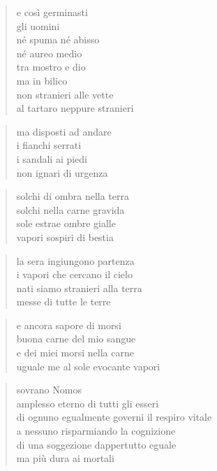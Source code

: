 	\begin{verse}
		e così germinasti\\
		gli uomini\\
		né spuma né abisso\\
		né aureo medio\\
		tra mostro e dio\\
		ma in bilico\\
		non stranieri alle vette\\
		al tartaro neppure stranieri
	\end{verse}

	\begin{verse}
		ma disposti ad andare\\
		i fianchi serrati\\
		i sandali ai piedi\\
		non ignari di urgenza
	\end{verse}

\clearpage



	\begin{verse}
		solchi di ombra nella terra\\
		solchi nella carne gravida\\
		sole estrae ombre gialle\\
		vapori sospiri di bestia
	\end{verse}

	\begin{verse}
		la sera ingiungono partenza\\
		i vapori che cercano il cielo\\
		nati siamo stranieri alla terra\\
		messe di tutte le terre
	\end{verse}

	\begin{verse}
		e ancora sapore di morsi\\
		buona carne del mio sangue\\
		e dei miei morsi nella carne\\
		uguale me al sole evocante vapori
	\end{verse}

\clearpage



	\begin{verse}
		sovrano Nomos\\
		amplesso eterno di tutti gli esseri\\
		di ognuno egualmente governi il respiro vitale\\
		a nessuno risparmiando la cognizione\\
		di una soggezione dappertutto eguale\\
		ma più dura ai mortali
	\end{verse}

